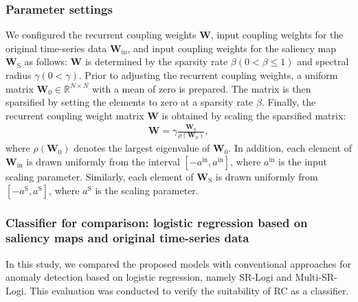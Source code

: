 \documentclass[pdflatex,sn-nature]{sn-jnl}
\theoremstyle{thmstyleone}%
\theoremstyle{thmstyletwo}%
\theoremstyle{thmstylethree}%
\begin{document}
\subsubsection*{Parameter settings} \label{sec:setParam}
We configured the recurrent coupling weights $\mathbf{W}$, input coupling weights for the original time-series data $\mathbf{W}_{\mathrm{in}}$, and input coupling weights for the saliency map $\mathbf{W}_{\mathrm{S}}$ as follows:
$\mathbf{W}$ is determined by the sparsity rate $\beta (0 < \beta \le 1)$ and spectral radius $\gamma (0 < \gamma)$.
Prior to adjusting the recurrent coupling weights, a uniform matrix $\mathbf{W}_{0} \in  \mathbb{R}^{N \times N}$ with a mean of zero is prepared.
The matrix is then sparsified by setting the elements to zero at a sparsity rate $\beta$.
Finally, the recurrent coupling weight matrix $\mathbf{W}$ is obtained by scaling the sparsified matrix:
    \begin{align} 
    \mathbf{W} = \gamma\frac{\mathbf{W}_0}{\rho(\mathbf{W}_0)},
    \end{align} 
where $\rho(\mathbf{W}_0)$ denotes the largest eigenvalue of $\mathbf{W}_{0}$.
In addition, each element of $\mathbf{W}_{\mathrm{in}}$ is drawn uniformly from the interval $[-a^\mathrm{in}, a^\mathrm{in}]$, where $a^\mathrm{in}$ is the input scaling parameter.
Similarly, each element of $\mathbf{W}_{\mathrm{S}}$ is drawn uniformly from $[-a^{\mathrm{S}}, a^{\mathrm{S}}]$, where $a^{\mathrm{S}}$ is the scaling parameter.

\subsubsection*{Classifier for comparison: logistic regression based on saliency maps and original time-series data}
In this study, we compared the proposed models with conventional approaches for anomaly detection based on logistic regression, namely SR-Logi and Multi-SR-Logi.
This evaluation was conducted to verify the suitability of RC as a classifier.
\end{document}
